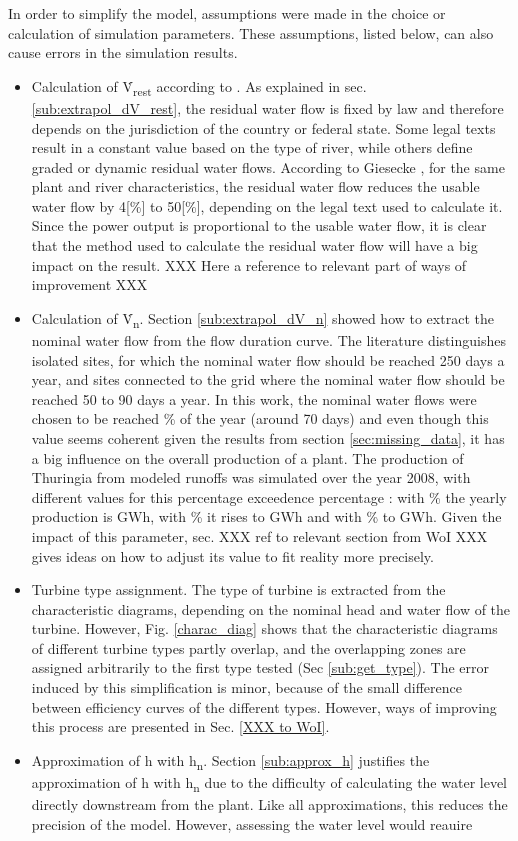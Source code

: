 In order to simplify the model, assumptions were made in the choice or calculation of simulation parameters. These assumptions, listed below, can also cause errors in the simulation results. 
\begin{itemize}
 \item Calculation of \.V\textsubscript{rest} according to \cite{pacer}. As explained in sec. \ref{sub:extrapol_dV_rest}, the residual water flow is fixed by law and therefore depends on the jurisdiction of the country or federal state. Some legal texts result in a constant value based on the type of river, while others define graded or dynamic residual water flows. According to Giesecke \cite{gies_qrest}, for the same plant and river characteristics, the residual water flow reduces the usable water flow by \unit{4}[\%] to \unit{50}[\%], depending on the legal text used to calculate it. Since the power output is proportional to the usable water flow, it is clear that the method used to calculate the residual water flow will have a big impact on the result. XXX Here a reference to relevant part of ways of improvement XXX
 \item Calculation of \.V\textsubscript{n}. Section \ref{sub:extrapol_dV_n} showed how to extract the nominal water flow from the flow duration curve. The literature distinguishes isolated sites, for which the nominal water flow should be reached 250 days a year, and sites connected to the grid where the nominal water flow should be reached 50 to 90 days a year. In this work, the nominal water flows were chosen to be reached \unit[20]{\%} of the year (around 70 days) and even though this value seems coherent given the results from section \ref{sec:missing_data}, it has a big influence on the overall production of a plant. The production of Thuringia from modeled runoffs was simulated over the year 2008, with different values for this percentage exceedence percentage :  with \unit[20]{\%} the yearly production is \unit[187]{GWh}, with \unit[30]{\%} it rises to \unit[210]{GWh} and with \unit[40]{\%} to \unit[223]{GWh}. Given the impact of this parameter, sec. XXX ref to relevant section from WoI XXX gives ideas on how to adjust its value to fit reality more precisely.
 \item Turbine type assignment. The type of turbine is extracted from the characteristic diagrams, depending on the nominal head and water flow of the turbine. However, Fig. \ref{charac_diag} shows that the characteristic diagrams of different turbine types partly overlap, and the overlapping zones are assigned arbitrarily to the first type tested (Sec \ref{sub:get_type}). The error induced by this simplification is minor, because of the small difference between efficiency curves of the different types. However, ways of improving this process are presented in Sec. \ref{XXX to WoI}.
 \item Approximation of h with h\textsubscript{n}. Section \ref{sub:approx_h} justifies the approximation of h with h\textsubscript{n} due to the difficulty of calculating the water level directly downstream from the plant.  Like all approximations, this reduces the precision of the model. However, assessing the water level would reauire 
\end{itemize}


